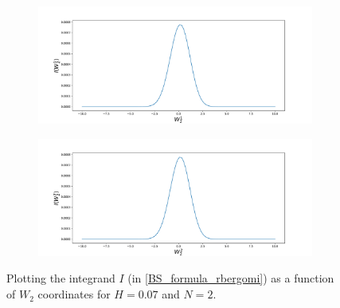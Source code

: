 \documentclass[11pt]{article}
\begin{document}
\begin{figure}[h!]
	\centering
	\begin{subfigure}{.45\textwidth}
		\centering
		\includegraphics[width=1\linewidth]{./figures/integrand_plotting_rBergomi/1D_plots/N_2/H_007/Bergomi_integrand_K_1_H_007_W21_N_2}
		\caption{}
		\label{fig:sub3}
	\end{subfigure}%
	\begin{subfigure}{.45\textwidth}
		\centering
		\includegraphics[width=1\linewidth]{./figures/integrand_plotting_rBergomi/1D_plots/N_2/H_007/Bergomi_integrand_K_1_H_007_W22_N_2}
		\caption{}
		\label{fig:sub4}
	\end{subfigure}
	\caption{Plotting the integrand $I$ (in \eqref{BS_formula_rbergomi}) as a function of $W_2$ coordinates for $H=0.07$ and $N=2$.}
	\label{fig:Integrand_H_007_N_2_W_2}
\end{figure}
\end{document}
